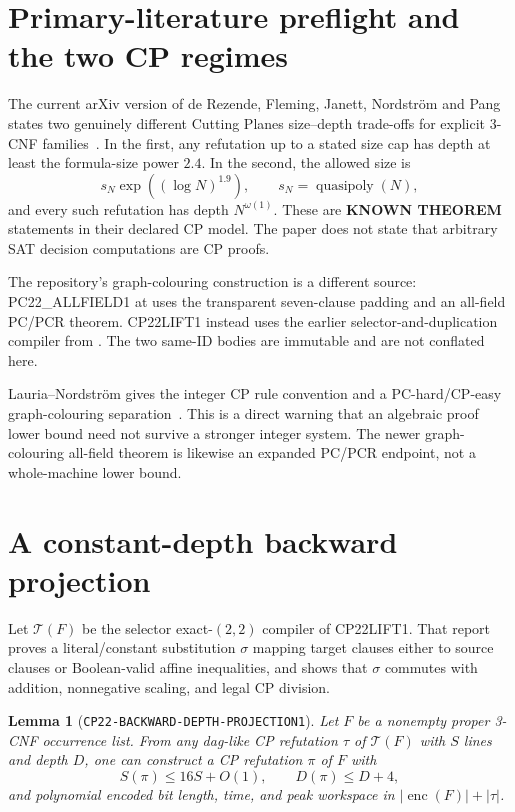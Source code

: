 \documentclass[11pt]{article}
\newtheorem{lemma}[theorem]{Lemma}
\newcommand{\KNOWN}{\textbf{KNOWN THEOREM}}
\begin{document}
\section{Primary-literature preflight and the two CP regimes}

The current arXiv version of de Rezende, Fleming, Janett, Nordstr\"om and
Pang states two genuinely different Cutting Planes size--depth trade-offs
for explicit 3-CNF families~\cite{drfjnp}.  In the first, any refutation up
to a stated size cap has depth at least the formula-size power $2.4$.  In the
second, the allowed size is
\[
 s_N\exp((\log N)^{1.9}),\qquad s_N=\operatorname{quasipoly}(N),
                                                               \tag{2}
\]
and every such refutation has depth $N^{\omega(1)}$.  These are
\KNOWN{} statements in their declared CP model.  The paper does not state
that arbitrary SAT decision computations are CP proofs.

The repository's graph-colouring construction is a different source:
PC22\_ALLFIELD1 at
uses the transparent seven-clause padding and an all-field PC/PCR theorem.
CP22LIFT1 instead uses the earlier selector-and-duplication compiler from
.
The two same-ID bodies are immutable and are not conflated here.

Lauria--Nordstr\"om gives the integer CP rule convention and a
PC-hard/CP-easy graph-colouring separation~\cite{ln}.  This is a direct
warning that an algebraic proof lower bound need not survive a stronger
integer system.  The newer graph-colouring all-field theorem
\cite{conneryd} is likewise an expanded PC/PCR endpoint, not a whole-machine
lower bound.

\section{A constant-depth backward projection}

Let $\mathcal T(F)$ be the selector exact-$(2,2)$ compiler of CP22LIFT1.
That report proves a literal/constant substitution $\sigma$ mapping target
clauses either to source clauses or Boolean-valid affine inequalities, and
shows that $\sigma$ commutes with addition, nonnegative scaling, and legal
CP division.

\begin{lemma}[\texttt{CP22-BACKWARD-DEPTH-PROJECTION1}]\label{lem:depth}
Let $F$ be a nonempty proper 3-CNF occurrence list.  From any dag-like CP
refutation $\tau$ of $\mathcal T(F)$ with $S$ lines and depth $D$, one can
construct a CP refutation $\pi$ of $F$ with
\[
                  S(\pi)\le 16S+O(1),\qquad
                  D(\pi)\le D+4,                                  \tag{3}
\]
and polynomial encoded bit length, time, and peak workspace in
$|\operatorname{enc}(F)|+|\tau|$.
\end{lemma}
\end{document}
